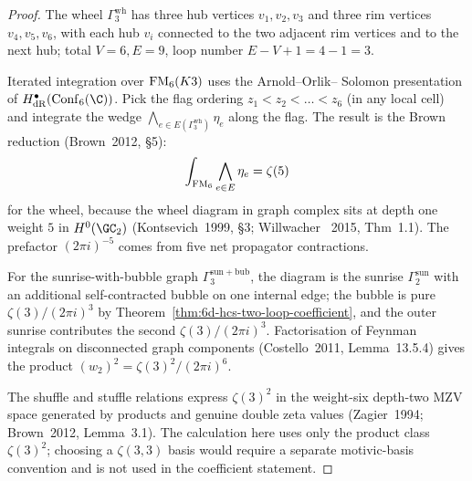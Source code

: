 \begin{proof}
The wheel $\Gamma_3^{\mathrm{wh}}$ has three hub vertices
$v_1, v_2, v_3$ and three rim vertices $v_4, v_5, v_6$, with each hub
$v_i$ connected to the two adjacent rim vertices and to the next hub;
total $V = 6, E = 9$, loop number $E - V + 1 = 4 - 1 = 3$.

Iterated integration over $\mathrm{FM}_6(K3)$ uses the Arnold--Orlik--
Solomon presentation of $H^\bullet_\DR(\Conf_6(\C))$. Pick the
flag ordering $z_1 < z_2 < \ldots < z_6$ (in any local cell) and
integrate the wedge
$\bigwedge_{e\in E(\Gamma_3^{\mathrm{wh}})} \eta_e$ along the flag.
The result is the Brown reduction
(Brown~2012, \S5):
\[
\int_{\mathrm{FM}_6}\bigwedge_{e\in E} \eta_e
= \zeta(5)
\]
for the wheel, because the wheel diagram in graph complex sits at
depth one weight $5$ in $H^0(\GC_2)$ (Kontsevich~1999, \S3; Willwacher~
2015, Thm~1.1). The prefactor $(2\pi i)^{-5}$ comes from five
net propagator contractions.

For the sunrise-with-bubble graph $\Gamma_3^{\mathrm{sun+bub}}$, the
diagram is the sunrise $\Gamma_2^{\mathrm{sun}}$ with an additional
self-contracted bubble on one internal edge; the bubble is pure
$\zeta(3)/(2\pi i)^3$ by Theorem~\ref{thm:6d-hcs-two-loop-coefficient},
and the outer sunrise contributes the second $\zeta(3)/(2\pi i)^3$.
Factorisation of Feynman integrals on disconnected graph components
(Costello~2011, Lemma~13.5.4) gives the product
$(w_2)^2 = \zeta(3)^2/(2\pi i)^6$.

The shuffle and stuffle relations express $\zeta(3)^2$ in the
weight-six depth-two MZV space generated by products and genuine
double zeta values (Zagier~1994; Brown~2012, Lemma~3.1). The
calculation here uses only the product class
$\zeta(3)^2$; choosing a $\zeta(3,3)$ basis would require a separate
motivic-basis convention and is not used in the coefficient statement.


\end{proof}
